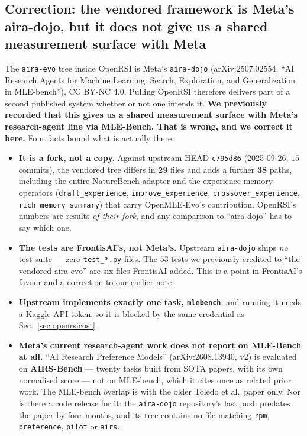 \subsection{Correction: the vendored framework is Meta's aira-dojo, but it does not give us a
shared measurement surface with Meta}
\label{sec:airadojo}

The \texttt{aira-evo} tree inside OpenRSI is Meta's \texttt{aira-dojo}
(arXiv:2507.02554, ``AI Research Agents for Machine Learning: Search, Exploration, and
Generalization in MLE-bench''), CC BY-NC 4.0. Pulling OpenRSI therefore delivers part of a
second published system whether or not one intends it. \textbf{We previously recorded that
this gives us a shared measurement surface with Meta's research-agent line via MLE-Bench.
That is wrong, and we correct it here.} Four facts bound what is actually there.

\begin{itemize}
\item \textbf{It is a fork, not a copy.} Against upstream HEAD \texttt{c795d86}
  (2025-09-26, $15$ commits), the vendored tree differs in $\mathbf{29}$ files and adds a
  further $\mathbf{38}$ paths, including the entire NatureBench adapter and the
  experience-memory operators (\texttt{draft\_experience}, \texttt{improve\_experience},
  \texttt{crossover\_experience}, \texttt{rich\_memory\_summary}) that carry OpenMLE-Evo's
  contribution. OpenRSI's numbers are results \emph{of their fork}, and any comparison to
  ``aira-dojo'' has to say which one.
\item \textbf{The tests are FrontisAI's, not Meta's.} Upstream \texttt{aira-dojo} ships
  \emph{no} test suite --- zero \texttt{test\_*.py} files. The $53$ tests we previously
  credited to ``the vendored aira-evo'' are six files FrontisAI added. This is a point in
  FrontisAI's favour and a correction to our earlier note.
\item \textbf{Upstream implements exactly one task, \texttt{mlebench}}, and running it needs
  a Kaggle API token, so it is blocked by the same credential as Sec.~\ref{sec:openrsicost}.
\item \textbf{Meta's current research-agent work does not report on MLE-Bench at all.}
  ``AI Research Preference Models'' (arXiv:2608.13940, v2) is evaluated on \textbf{AIRS-Bench}
  --- twenty tasks built from SOTA papers, with its own normalised score --- not on MLE-bench,
  which it cites once as related prior work. The MLE-bench overlap is with the older Toledo
  et al.\ paper only. Nor is there a code release for it: the \texttt{aira-dojo} repository's
  last push predates the paper by four months, and its tree contains no file matching
  \texttt{rpm}, \texttt{preference}, \texttt{pilot} or \texttt{airs}.
\end{itemize}

